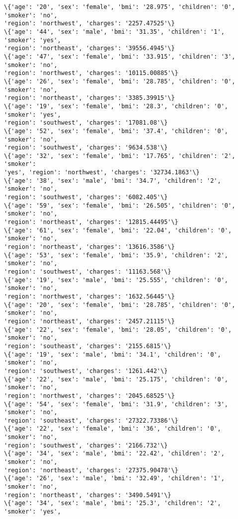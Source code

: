 \documentclass[11pt]{article}
\begin{document}
\begin{Verbatim}[commandchars=\\\{\}]
\{'age': '20', 'sex': 'female', 'bmi': '28.975', 'children': '0', 'smoker': 'no',
'region': 'northwest', 'charges': '2257.47525'\}
\{'age': '44', 'sex': 'male', 'bmi': '31.35', 'children': '1', 'smoker': 'yes',
'region': 'northeast', 'charges': '39556.4945'\}
\{'age': '47', 'sex': 'female', 'bmi': '33.915', 'children': '3', 'smoker': 'no',
'region': 'northwest', 'charges': '10115.00885'\}
\{'age': '26', 'sex': 'female', 'bmi': '28.785', 'children': '0', 'smoker': 'no',
'region': 'northeast', 'charges': '3385.39915'\}
\{'age': '19', 'sex': 'female', 'bmi': '28.3', 'children': '0', 'smoker': 'yes',
'region': 'southwest', 'charges': '17081.08'\}
\{'age': '52', 'sex': 'female', 'bmi': '37.4', 'children': '0', 'smoker': 'no',
'region': 'southwest', 'charges': '9634.538'\}
\{'age': '32', 'sex': 'female', 'bmi': '17.765', 'children': '2', 'smoker':
'yes', 'region': 'northwest', 'charges': '32734.1863'\}
\{'age': '38', 'sex': 'male', 'bmi': '34.7', 'children': '2', 'smoker': 'no',
'region': 'southwest', 'charges': '6082.405'\}
\{'age': '59', 'sex': 'female', 'bmi': '26.505', 'children': '0', 'smoker': 'no',
'region': 'northeast', 'charges': '12815.44495'\}
\{'age': '61', 'sex': 'female', 'bmi': '22.04', 'children': '0', 'smoker': 'no',
'region': 'northeast', 'charges': '13616.3586'\}
\{'age': '53', 'sex': 'female', 'bmi': '35.9', 'children': '2', 'smoker': 'no',
'region': 'southwest', 'charges': '11163.568'\}
\{'age': '19', 'sex': 'male', 'bmi': '25.555', 'children': '0', 'smoker': 'no',
'region': 'northwest', 'charges': '1632.56445'\}
\{'age': '20', 'sex': 'female', 'bmi': '28.785', 'children': '0', 'smoker': 'no',
'region': 'northeast', 'charges': '2457.21115'\}
\{'age': '22', 'sex': 'female', 'bmi': '28.05', 'children': '0', 'smoker': 'no',
'region': 'southeast', 'charges': '2155.6815'\}
\{'age': '19', 'sex': 'male', 'bmi': '34.1', 'children': '0', 'smoker': 'no',
'region': 'southwest', 'charges': '1261.442'\}
\{'age': '22', 'sex': 'male', 'bmi': '25.175', 'children': '0', 'smoker': 'no',
'region': 'northwest', 'charges': '2045.68525'\}
\{'age': '54', 'sex': 'female', 'bmi': '31.9', 'children': '3', 'smoker': 'no',
'region': 'southeast', 'charges': '27322.73386'\}
\{'age': '22', 'sex': 'female', 'bmi': '36', 'children': '0', 'smoker': 'no',
'region': 'southwest', 'charges': '2166.732'\}
\{'age': '34', 'sex': 'male', 'bmi': '22.42', 'children': '2', 'smoker': 'no',
'region': 'northeast', 'charges': '27375.90478'\}
\{'age': '26', 'sex': 'male', 'bmi': '32.49', 'children': '1', 'smoker': 'no',
'region': 'northeast', 'charges': '3490.5491'\}
\{'age': '34', 'sex': 'male', 'bmi': '25.3', 'children': '2', 'smoker': 'yes',

\end{Verbatim}
\end{document}
